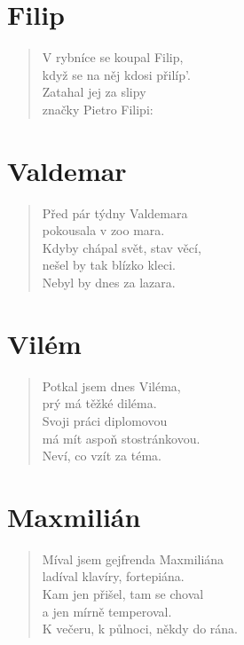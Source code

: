 \section*{Filip}
\begin{verse}
V rybníce se koupal Filip,\\
když se na něj kdosi přilíp'.\\
Zatahal jej za slipy\\
značky Pietro Filipi:\\
\end{verse}

\section*{Valdemar}
\begin{verse}
Před pár týdny Valdemara\\
pokousala v zoo mara.\\
Kdyby chápal svět, stav věcí,\\
nešel by tak blízko kleci.\\
Nebyl by dnes za lazara.
\end{verse}

\section*{Vilém}
\begin{verse}
Potkal jsem dnes Viléma,\\
prý má těžké diléma.\\
Svoji práci diplomovou\\
má mít aspoň stostránkovou.\\
Neví, co vzít za téma.	
\end{verse}

\section*{Maxmilián}
\begin{verse}
Míval jsem gejfrenda Maxmiliána\\
ladíval klavíry, fortepiána.\\
Kam jen přišel, tam se choval\\
a jen mírně temperoval.\\
K večeru, k půlnoci, někdy do rána.	
\end{verse}

